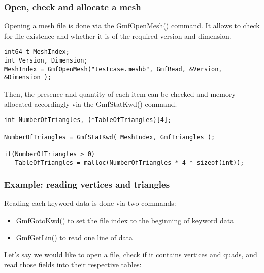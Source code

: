 \documentclass[a4paper,12pt]{article}
\begin{document}
\subsubsection{Open, check and allocate a mesh}

Opening a mesh file is done via the GmfOpenMesh() command. It allows to check for file existence and whether it is of the required version and dimension.

\begin{tt}
\begin{verbatim}
int64_t MeshIndex;
int Version, Dimension;
MeshIndex = GmfOpenMesh("testcase.meshb", GmfRead, &Version, &Dimension );
\end{verbatim}
\end{tt}
\normalfont

Then, the presence and quantity of each item can be checked and memory allocated accordingly via the GmfStatKwd() command.

\begin{tt}
\begin{verbatim}
int NumberOfTriangles, (*TableOfTriangles)[4];

NumberOfTriangles = GmfStatKwd( MeshIndex, GmfTriangles );

if(NumberOfTriangles > 0)
   TableOfTriangles = malloc(NumberOfTriangles * 4 * sizeof(int));
\end{verbatim}
\end{tt}
\normalfont


\subsubsection{Example: reading vertices and triangles}

Reading each keyword data is done via two commands:

\begin{itemize}
\item GmfGotoKwd() to set the file index to the beginning of keyword data
\item GmfGetLin() to read one line of data
\end{itemize}

Let's say we would like to open a file, check if it contains vertices and quads, and read those fields into their respective tables:
\end{document}
